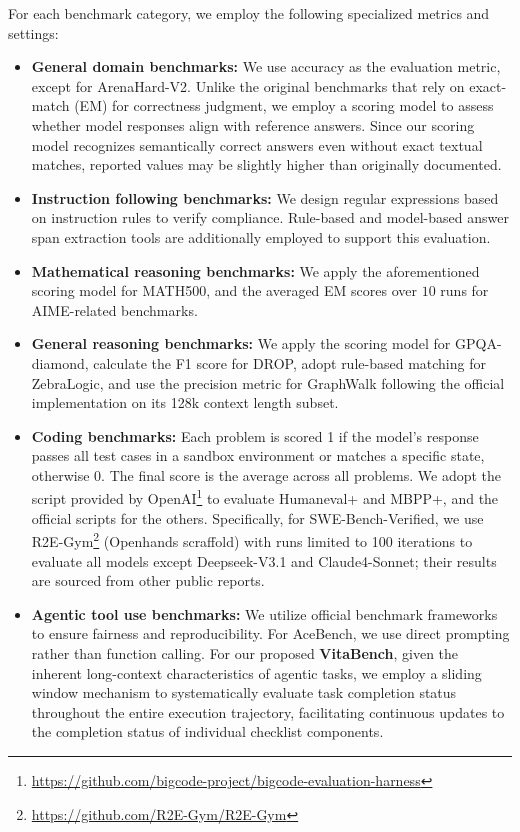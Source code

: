 \documentclass{article}
\begin{document}
For each benchmark category, we employ the following specialized metrics and settings:
\begin{itemize}
    \item \textbf{General domain benchmarks:} We use accuracy as the evaluation metric, except for ArenaHard-V2. Unlike the original benchmarks that rely on exact-match (EM) for correctness judgment, we employ a scoring model to assess whether model responses align with reference answers. Since our scoring model recognizes semantically correct answers even without exact textual matches, reported values may be slightly higher than originally documented.
    \item \textbf{Instruction following benchmarks:} We design regular expressions based on instruction rules to verify compliance. Rule-based and model-based answer span extraction tools are additionally employed to support this evaluation.
    \item \textbf{Mathematical reasoning benchmarks:} We apply the aforementioned scoring model for MATH500, and the averaged EM scores over $10$ runs for AIME-related benchmarks.
    \item \textbf{General reasoning benchmarks:}  We apply the scoring model for GPQA-diamond, calculate the F1 score for DROP, adopt rule-based matching for ZebraLogic, and use the precision metric for GraphWalk following the official implementation on its 128k context length subset.
    \item \textbf{Coding benchmarks:} Each problem is scored 1 if the model's response passes all test cases in a sandbox environment or matches a specific state, otherwise 0. The final score is the average across all problems. We adopt the script provided by OpenAI\footnote{\url{https://github.com/bigcode-project/bigcode-evaluation-harness}} to evaluate Humaneval+ and MBPP+, and the official scripts for the others. Specifically, for SWE-Bench-Verified, we use R2E-Gym\footnote{\url{https://github.com/R2E-Gym/R2E-Gym}} (Openhands scraffold) with runs limited to 100 iterations to evaluate all models except Deepseek-V3.1 and Claude4-Sonnet; their results are sourced from other public reports.
    \item \textbf{Agentic tool use benchmarks:} We utilize official benchmark frameworks to ensure fairness and reproducibility. For AceBench, we use direct prompting rather than function calling. For our proposed \textbf{VitaBench}, given the inherent long-context characteristics of agentic tasks, we employ a sliding window mechanism to systematically evaluate task completion status throughout the entire execution trajectory, facilitating continuous updates to the completion status of individual checklist components.
\end{itemize}
\end{document}
